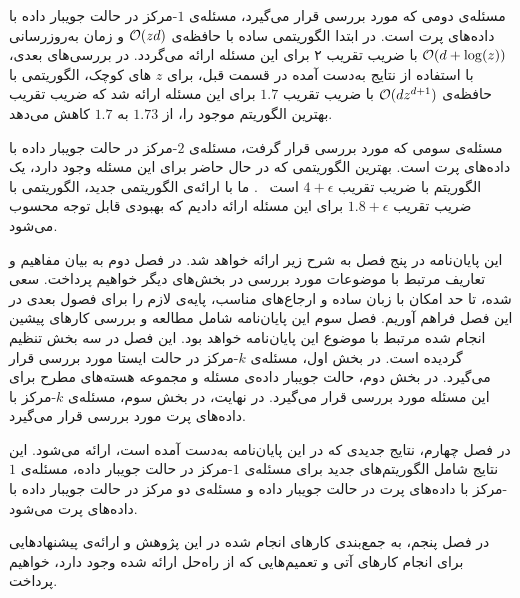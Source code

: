 مسئله‌ی دومی که مورد بررسی قرار می‌گیرد، مسئله‌ی $1$-مرکز در حالت جویبار داده با داده‌های پرت است.
در ابتدا الگوریتمی ساده با حافظه‌ی $\mathcal{O}(zd)$ و زمان به‌روزرسانی $\mathcal{O}(d + \log(z))$ با ضریب تقریب ۲ برای این مسئله ارائه می‌گردد.
در بررسی‌های بعدی، با استفاده از نتایج به‌دست آمده در قسمت قبل، برای $z$ های کوچک، الگوریتمی با حافظه‌ی $\mathcal{O}(dz^{d+1})$ با ضریب تقریب $1.7$ برای این مسئله ارائه شد که ضریب تقریب بهترین الگوریتم موجود را، از $1.73$ به $1.7$ کاهش می‌دهد.

مسئله‌ی سومی که مورد بررسی قرار گرفت، مسئله‌ی $2$-مرکز در حالت جویبار داده با داده‌های پرت است.
بهترین الگوریتمی که در حال حاضر برای این مسئله وجود دارد، یک الگوریتم با ضریب تقریب $4 + \epsilon$ است ~.
ما با ارائه‌ی الگوریتمی جدید، الگوریتمی با ضریب تقریب $1.8 + \epsilon$ برای این مسئله ارائه دادیم که بهبودی قابل توجه محسوب می‌شود.
 


این پایان‌نامه در پنج فصل به شرح زیر ارائه خواهد شد.
در فصل دوم به بیان مفاهیم و تعاریف مرتبط با موضوعات مورد بررسی در بخش‌های دیگر خواهیم پرداخت. سعی شده، تا حد امکان با زبان ساده و ارجاع‌های مناسب، پایه‌ی لازم را برای فصول بعدی در این فصل فراهم آوریم.
فصل سوم این پایان‌نامه شامل مطالعه و بررسی کارهای پیشین انجام شده مرتبط با موضوع این پایان‌نامه خواهد بود.
این فصل در سه بخش تنظیم گردیده است.
در بخش اول، مسئله‌ی $k$-مرکز در حالت ایستا مورد بررسی قرار می‌گیرد.
در بخش دوم، حالت جویبار داده‌ی مسئله و مجموعه هسته‌های مطرح برای این مسئله مورد بررسی قرار می‌گیرد. در نهایت، در بخش سوم، مسئله‌ی $k$-مرکز با داده‌های پرت مورد بررسی قرار می‌گیرد.

در فصل چهارم، نتایج جدیدی که در این پایان‌نامه به‌دست آمده است، ارائه می‌شود.
این نتایج شامل الگوریتم‌های جدید برای مسئله‌ی $1$-مرکز در حالت جویبار داده، مسئله‌ی $1$-مرکز با داده‌های پرت در حالت جویبار داده و مسئله‌ی دو مرکز در حالت جویبار داده با داده‌های پرت می‌شود.

در فصل پنجم، به جمع‌بندی کارهای انجام شده در این پژوهش و ارائه‌ی پیشنهادهایی برای انجام کارهای آتی و تعمیم‌هایی که از راه‌حل ارائه شده وجود دارد، خواهیم پرداخت.